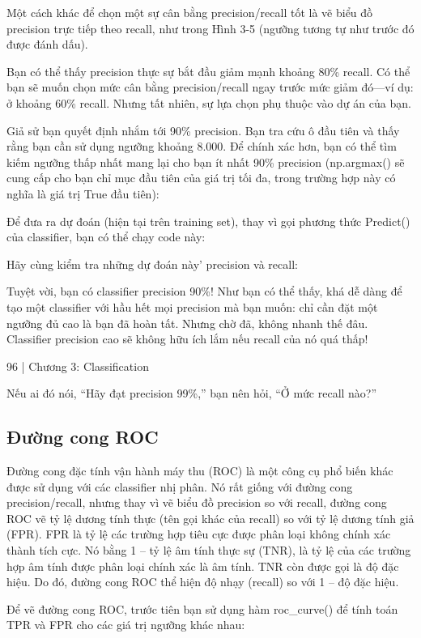 Một cách khác để chọn một sự cân bằng precision/recall tốt là vẽ biểu đồ precision trực tiếp theo recall, như trong Hình 3-5 (ngưỡng tương tự như trước đó được đánh dấu).

Bạn có thể thấy precision thực sự bắt đầu giảm mạnh khoảng 80\% recall. Có thể bạn sẽ muốn chọn mức cân bằng precision/recall ngay trước mức giảm đó—ví dụ: ở khoảng 60\% recall. Nhưng tất nhiên, sự lựa chọn phụ thuộc vào dự án của bạn.

Giả sử bạn quyết định nhắm tới 90\% precision. Bạn tra cứu ô đầu tiên và thấy rằng bạn cần sử dụng ngưỡng khoảng 8.000. Để chính xác hơn, bạn có thể tìm kiếm ngưỡng thấp nhất mang lại cho bạn ít nhất 90\% precision (np.argmax() sẽ cung cấp cho bạn chỉ mục đầu tiên của giá trị tối đa, trong trường hợp này có nghĩa là giá trị True đầu tiên):

Để đưa ra dự đoán (hiện tại trên training set), thay vì gọi phương thức Predict() của classifier, bạn có thể chạy code này:

Hãy cùng kiểm tra những dự đoán này’ precision và recall:

Tuyệt vời, bạn có classifier precision 90\%! Như bạn có thể thấy, khá dễ dàng để tạo một classifier với hầu hết mọi precision mà bạn muốn: chỉ cần đặt một ngưỡng đủ cao là bạn đã hoàn tất. Nhưng chờ đã, không nhanh thế đâu. Classifier precision cao sẽ không hữu ích lắm nếu recall của nó quá thấp!

96 | Chương 3: Classification

Nếu ai đó nói, “Hãy đạt precision 99\%,” bạn nên hỏi, “Ở mức recall nào?”

\subsection{Đường cong ROC}

Đường cong đặc tính vận hành máy thu (ROC) là một công cụ phổ biến khác được sử dụng với các classifier nhị phân. Nó rất giống với đường cong precision/recall, nhưng thay vì vẽ biểu đồ precision so với recall, đường cong ROC vẽ tỷ lệ dương tính thực (tên gọi khác của recall) so với tỷ lệ dương tính giả (FPR). FPR là tỷ lệ các trường hợp tiêu cực được phân loại không chính xác thành tích cực. Nó bằng 1 – tỷ lệ âm tính thực sự (TNR), là tỷ lệ của các trường hợp âm tính được phân loại chính xác là âm tính. TNR còn được gọi là độ đặc hiệu. Do đó, đường cong ROC thể hiện độ nhạy (recall) so với 1 – độ đặc hiệu.

Để vẽ đường cong ROC, trước tiên bạn sử dụng hàm roc\_curve() để tính toán TPR và FPR cho các giá trị ngưỡng khác nhau:

